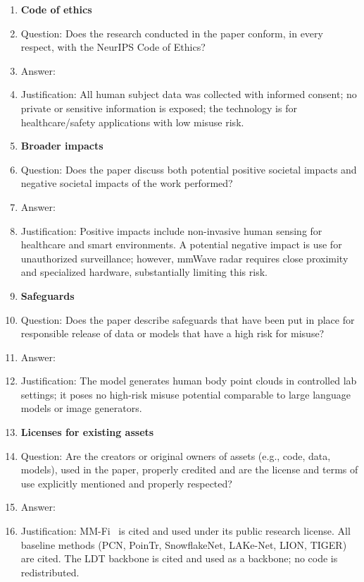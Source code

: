 \begin{enumerate}
\item {\bf Code of ethics}
    \item[] Question: Does the research conducted in the paper conform, in every respect, with the NeurIPS Code of Ethics?
    \item[] Answer: \answerYes{}
    \item[] Justification: All human subject data was collected with informed consent; no private or sensitive information is exposed; the technology is for healthcare/safety applications with low misuse risk.

\item {\bf Broader impacts}
    \item[] Question: Does the paper discuss both potential positive societal impacts and negative societal impacts of the work performed?
    \item[] Answer: \answerYes{}
    \item[] Justification: Positive impacts include non-invasive human sensing for healthcare and smart environments. A potential negative impact is use for unauthorized surveillance; however, mmWave radar requires close proximity and specialized hardware, substantially limiting this risk.

\item {\bf Safeguards}
    \item[] Question: Does the paper describe safeguards that have been put in place for responsible release of data or models that have a high risk for misuse?
    \item[] Answer: \answerNA{}
    \item[] Justification: The model generates human body point clouds in controlled lab settings; it poses no high-risk misuse potential comparable to large language models or image generators.

\item {\bf Licenses for existing assets}
    \item[] Question: Are the creators or original owners of assets (e.g., code, data, models), used in the paper, properly credited and are the license and terms of use explicitly mentioned and properly respected?
    \item[] Answer: \answerYes{}
    \item[] Justification: MM-Fi~\cite{yang2023mmfi} is cited and used under its public research license. All baseline methods (PCN, PoinTr, SnowflakeNet, LAKe-Net, LION, TIGER) are cited. The LDT backbone is cited and used as a backbone; no code is redistributed.


\end{enumerate}
